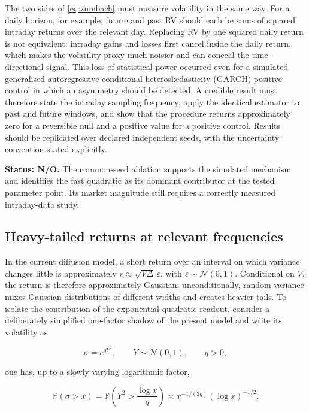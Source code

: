 \documentclass[11pt,a4paper]{article}
\newcommand{\Pp}{\mathbb{P}}
\begin{document}
\begin{warningbox}
The two sides of \cref{eq:zumbach} must measure volatility in the same way.  For a daily horizon,
for example, future and past RV should each be sums of squared intraday returns over the relevant
day.  Replacing RV by one squared daily return is not equivalent: intraday gains and losses first
cancel inside the daily return, which makes the volatility proxy much noisier and can conceal
the time-directional signal.  This loss of statistical power occurred even for a simulated
generalised autoregressive conditional heteroskedasticity (GARCH) positive control in which an
asymmetry should be detected.  A credible result must therefore state the intraday sampling
frequency, apply the identical estimator to past and future windows, and show that the procedure
returns approximately zero for a reversible null and a positive value for a positive control.
Results should be replicated over declared independent seeds, with the uncertainty convention
stated explicitly.
\end{warningbox}

\textbf{Status: N/O.} The common-seed ablation supports the simulated mechanism and identifies
the fast quadratic as its dominant contributor at the tested parameter point.  Its market
magnitude still requires a correctly measured intraday-data study.

\subsection{Heavy-tailed returns at relevant frequencies}

In the current diffusion model, a short return over an interval on which variance changes
little is approximately \(r\approx\sqrt{V\Delta}\,\varepsilon\), with
\(\varepsilon\sim\mathcal N(0,1)\).  Conditional on \(V\), the return is therefore approximately
Gaussian; unconditionally, random variance mixes Gaussian distributions of different widths
and creates heavier tails.  To isolate the contribution of the exponential-quadratic readout,
consider a deliberately simplified one-factor shadow of the present model and write its
volatility as

\begin{equation}
\sigma=e^{qY^2},\qquad Y\sim\mathcal N(0,1),\qquad q>0,
\end{equation}

one has, up to a slowly varying logarithmic factor,

\begin{equation}
\Pp(\sigma>x)
=\Pp\!\left(Y^2>\frac{\log x}{q}\right)
\asymp x^{-1/(2q)}(\log x)^{-1/2}.
\label{eq:scalar-tail}
\end{equation}
\end{document}
